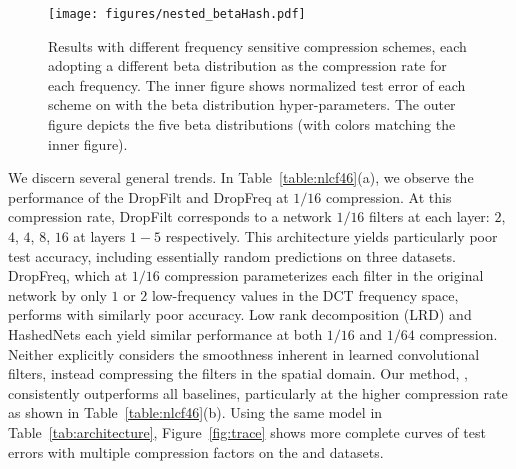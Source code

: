 \documentclass{article} %
\begin{document}
\begin{wrapfigure}{r}{0.5\textwidth}
\vspace{-2ex}
    \texttt{[image: figures/nested\_betaHash.pdf]}
    \vspace{-4ex}\caption{Results with different frequency sensitive compression schemes, each adopting a different beta distribution as the compression rate for each frequency. The inner figure shows normalized test error of each scheme on  with the beta distribution hyper-parameters. The outer figure depicts the five beta distributions (with colors matching the inner figure).}
    \label{fig:beta_hashing}
\end{wrapfigure}
We discern several general trends.
In Table~\ref{table:nlcf46}(a), we observe the performance of the DropFilt and DropFreq at $1/16$ compression.
At this compression rate, DropFilt corresponds to a network $1/16$ filters at each layer: $2$, $4$, $4$, $8$, $16$ at layers $1\!-\!5$ respectively.
This architecture yields particularly poor test accuracy, including essentially random predictions on three datasets.
DropFreq, which at $1/16$ compression parameterizes each filter in the original network by only $1$ or $2$ low-frequency values in the DCT frequency space, performs with similarly poor accuracy.
Low rank decomposition (LRD) and HashedNets each yield similar performance at both $1/16$ and $1/64$ compression.
Neither explicitly considers the smoothness inherent in learned convolutional filters, instead compressing the filters in the spatial domain.
Our method, \abbrev{}, consistently outperforms all baselines, particularly at the higher compression rate as shown in Table~\ref{table:nlcf46}(b).
Using the same model in Table~\ref{tab:architecture}, Figure~\ref{fig:trace} shows more complete curves of test errors with multiple compression factors on the  and  datasets.
\end{document}
